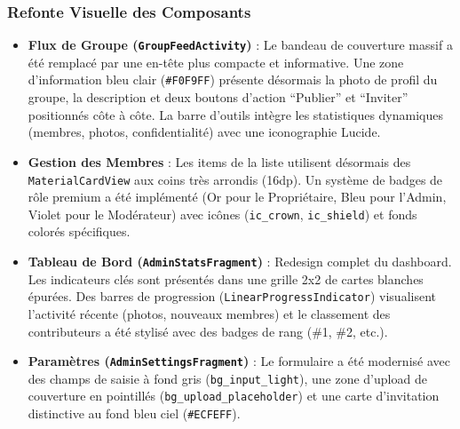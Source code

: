 \documentclass{article}
\begin{document}
\subsubsection{Refonte Visuelle des Composants}
\begin{itemize}
    \item \textbf{Flux de Groupe (\texttt{GroupFeedActivity})} : Le bandeau de couverture massif a été remplacé par une en-tête plus compacte et informative. Une zone d'information bleu clair (\texttt{\#F0F9FF}) présente désormais la photo de profil du groupe, la description et deux boutons d'action ``Publier'' et ``Inviter'' positionnés côte à côte. La barre d'outils intègre les statistiques dynamiques (membres, photos, confidentialité) avec une iconographie Lucide.
    \item \textbf{Gestion des Membres} : Les items de la liste utilisent désormais des \texttt{MaterialCardView} aux coins très arrondis (16dp). Un système de badges de rôle premium a été implémenté (Or pour le Propriétaire, Bleu pour l'Admin, Violet pour le Modérateur) avec icônes (\texttt{ic\_crown}, \texttt{ic\_shield}) et fonds colorés spécifiques.
    \item \textbf{Tableau de Bord (\texttt{AdminStatsFragment})} : Redesign complet du dashboard. Les indicateurs clés sont présentés dans une grille 2x2 de cartes blanches épurées. Des barres de progression (\texttt{LinearProgressIndicator}) visualisent l'activité récente (photos, nouveaux membres) et le classement des contributeurs a été stylisé avec des badges de rang (\#1, \#2, etc.).
    \item \textbf{Paramètres (\texttt{AdminSettingsFragment})} : Le formulaire a été modernisé avec des champs de saisie à fond gris (\texttt{bg\_input\_light}), une zone d'upload de couverture en pointillés (\texttt{bg\_upload\_placeholder}) et une carte d'invitation distinctive au fond bleu ciel (\texttt{\#ECFEFF}).
\end{itemize}
\end{document}
